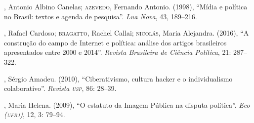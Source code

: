 \begin{bibliohedra}
, Antonio Albino Canelas; \textsc{azevedo}, Fernando Antonio. (1998),
``Mídia e política no Brasil: textos e agenda de pesquisa''. \textit{Lua
Nova}, 43, 189--216.

, Rafael Cardoso; \textsc{bragatto}, Rachel Callai; \textsc{nicolás}, Maria
Alejandra. (2016), ``A construção do campo de Internet e política:
análise dos artigos brasileiros apresentados entre 2000 e 2014''.
\textit{Revista Brasileira de Ciência Política}, 21: 287--322.

, Sérgio Amadeu. (2010), ``Ciberativismo, cultura hacker e o
individualismo colaborativo''. \textit{Revista \textsc{usp}}, 86: 28--39.

, Maria Helena. (2009), ``O estatuto da Imagem Pública na disputa
política''. \textit{Eco (\textsc{ufrj})}, 12, 3: 79--94.
\end{bibliohedra}
